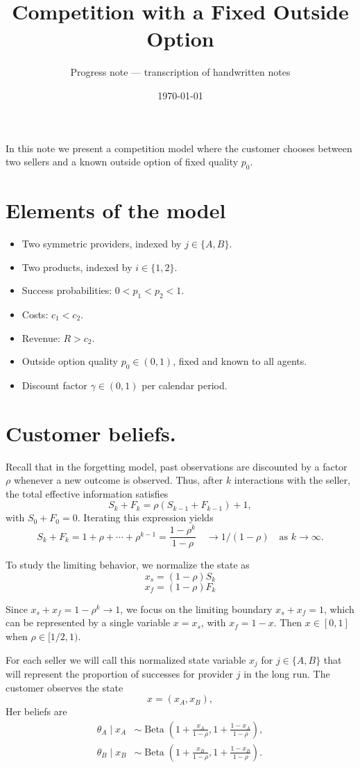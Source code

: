 \documentclass[11pt]{article}
\title{Competition with a Fixed Outside Option}
\author{Progress note --- transcription of handwritten notes}
\date{\today}
\DeclareMathOperator{\Beta}{Beta}
\begin{document}
\maketitle
In this note we present a competition model where the customer chooses
between two sellers and a known outside option of fixed quality $p_0$.

\section{Elements of the model}

\begin{itemize}
\item Two symmetric providers, indexed by $j\in\{A,B\}$.
\item Two products, indexed by $i\in\{1,2\}$.
\item Success probabilities: $0<p_1<p_2<1$.
\item Costs: $c_1<c_2$.
\item Revenue: $R>c_2$.
\item Outside option quality $p_0\in(0,1)$, fixed and known to all agents.
\item Discount factor $\gamma\in(0,1)$ per calendar period.
\end{itemize}

\section{Customer beliefs.}
Recall that in the forgetting model, past observations are discounted by a factor $\rho$ whenever a new outcome is observed. Thus, after $k$ interactions with the seller, the total effective information satisfies
$$
S_k+F_k=\rho(S_{k-1}+F_{k-1})+1,
$$
with \(S_0+F_0=0\). Iterating this expression yields
$$
S_k+F_k=1+\rho+\cdots+\rho^{k-1}
=\frac{1-\rho^k}{1-\rho} \quad \to 1/(1-\rho)\quad\text{as }k\to\infty.
$$

To study the limiting behavior, we normalize the state as 
$$x_s=(1-\rho)S_k$$ 
$$x_f=(1-\rho)F_k$$

Since $x_s+x_f=1-\rho^k\to1$, we focus on the limiting boundary $x_s+x_f=1$, which can be represented by a single variable $x=x_s$, with $x_f=1-x$. Then $x\in [0,1]$ when $\rho \in [1/2,1)$. 

For each seller we will call this normalized state variable $x_j$ for $j\in\{A,B\}$ that will represent the proportion of successes for provider $j$ in the long run. The customer observes the state
$$
x=(x_A,x_B),
$$
Her beliefs are
\begin{align}
\theta_A\mid x_A&\sim\Beta(1+\frac{x_A}{1-\rho},1+\frac{1-x_A}{1-\rho}),\\
\theta_B\mid x_B&\sim\Beta(1+\frac{x_B}{1-\rho},1+\frac{1-x_B}{1-\rho}).
\end{align}
\end{document}
